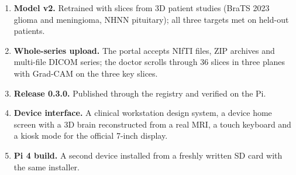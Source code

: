 \documentclass[11pt,a4paper]{article}
\begin{document}
\begin{enumerate}[label=\textbf{\arabic*.}]
\item \textbf{Model v2.} Retrained with slices from 3D patient studies (BraTS 2023 glioma and meningioma, NHNN
pituitary); all three targets met on held-out patients.
\item \textbf{Whole-series upload.} The portal accepts NIfTI files, ZIP archives and multi-file DICOM series; the
doctor scrolls through 36 slices in three planes with Grad-CAM on the three key slices.
\item \textbf{Release 0.3.0.} Published through the registry and verified on the Pi.
\item \textbf{Device interface.} A clinical workstation design system, a device home screen with a 3D brain
reconstructed from a real MRI, a touch keyboard and a kiosk mode for the official 7-inch display.
\item \textbf{Pi 4 build.} A second device installed from a freshly written SD card with the same installer.
\end{enumerate}

\end{document}
